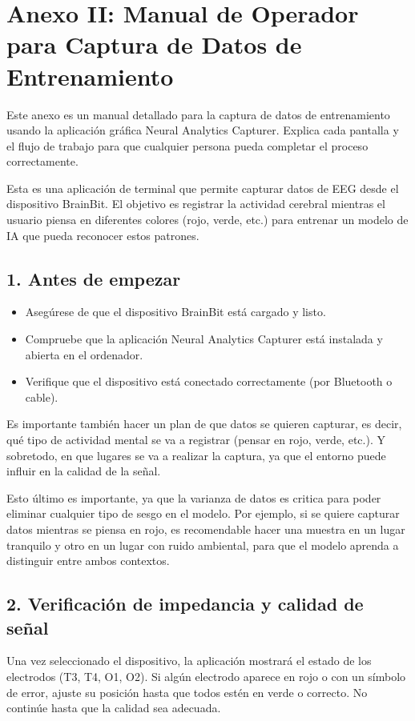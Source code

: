 \chapter*{Anexo II: Manual de Operador para Captura de Datos de Entrenamiento}

Este anexo es un manual detallado para la captura de datos de entrenamiento usando la aplicación gráfica Neural Analytics Capturer. Explica cada pantalla y el flujo de trabajo para que cualquier persona pueda completar el proceso correctamente.

Esta es una aplicación de terminal que permite capturar datos de EEG desde el dispositivo BrainBit. El objetivo es registrar la actividad cerebral mientras el usuario piensa en diferentes colores (rojo, verde, etc.) para entrenar un modelo de IA que pueda reconocer estos patrones.

\section*{1. Antes de empezar}
\begin{itemize}
    \item Asegúrese de que el dispositivo BrainBit está cargado y listo.
    \item Compruebe que la aplicación Neural Analytics Capturer está instalada y abierta en el ordenador.
    \item Verifique que el dispositivo está conectado correctamente (por Bluetooth o cable).
\end{itemize}

Es importante también hacer un plan de que datos se quieren capturar, es decir, qué tipo de actividad mental se va a registrar (pensar en rojo, verde, etc.). Y sobretodo, en que lugares se va a realizar la captura, ya que el entorno puede influir en la calidad de la señal.

Esto último es importante, ya que la varianza de datos es critica para poder eliminar cualquier tipo de sesgo en el modelo. Por ejemplo, si se quiere capturar datos mientras se piensa en rojo, es recomendable hacer una muestra en un lugar tranquilo y otro en un lugar con ruido ambiental, para que el modelo aprenda a distinguir entre ambos contextos.

\newpage
\section*{2. Verificación de impedancia y calidad de señal}
Una vez seleccionado el dispositivo, la aplicación mostrará el estado de los electrodos (T3, T4, O1, O2). Si algún electrodo aparece en rojo o con un símbolo de error, ajuste su posición hasta que todos estén en verde o correcto. No continúe hasta que la calidad sea adecuada.

